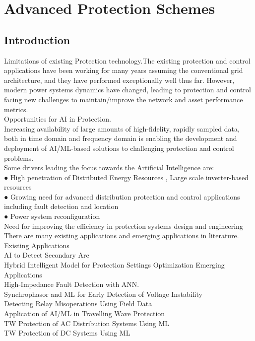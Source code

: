 \chapter{Advanced Protection Schemes} \label{ch_5}
\section{Introduction}
Limitations of existing Protection technology.The existing protection and control applications have been working for many years assuming the conventional grid architecture, and they have performed exceptionally well thus far. However, modern power systems dynamics have changed, leading to protection and control facing new challenges to maintain/improve the network and asset performance  metrics.\\
Opportunities for AI in Protection.\\
Increasing availability of large amounts of high-fidelity, rapidly sampled data, both in time domain and frequency domain is enabling the development and deployment of AI/ML-based solutions to challenging protection and control problems. \\
Some drivers leading the focus towards the Artificial Intelligence are: \\
● High penetration of Distributed Energy Resources , Large scale inverter-based resources \\
● Growing need for advanced distribution protection and control applications including fault detection and location \\
● Power system reconfiguration \\
Need for improving the efficiency in protection systems design and engineering 
There are many existing applications and emerging applications in literature.\\

Existing Applications \\
		AI to Detect Secondary Arc \\
		Hybrid Intelligent Model for Protection Settings Optimization
 	Emerging Applications \\
		High-Impedance Fault Detection with ANN. \\
		Synchrophasor and ML for Early Detection of Voltage Instability\\
		Detecting Relay Misoperations Using Field Data \\ 
		Application of AI/ML in Travelling Wave Protection\\
			TW Protection of AC Distribution Systems Using ML \\
			 TW Protection of DC Systems Using ML \\





